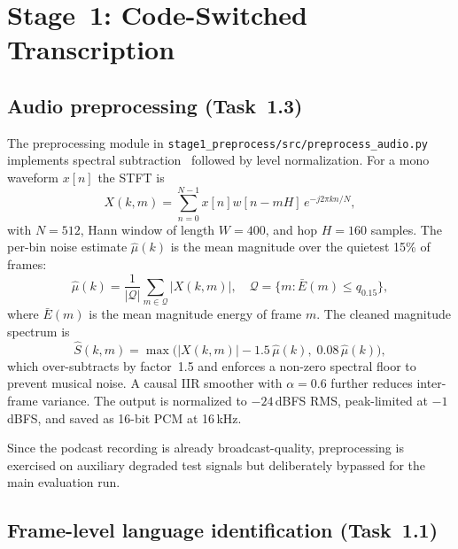 \documentclass[10pt,twocolumn,letterpaper]{article}
\begin{document}
\section{Stage~1: Code-Switched Transcription}
\label{sec:part1}

\subsection{Audio preprocessing (Task~1.3)}
\label{sec:preproc}

The preprocessing module in \texttt{stage1\_preprocess/src/preprocess\_audio.py}
implements spectral subtraction~\cite{boll1979spectral} followed by
level normalization.  For a mono waveform $x[n]$ the STFT is
\begin{equation}
  X(k,m) = \sum_{n=0}^{N-1} x[n]w[n-mH]\,e^{-j2\pi kn/N},
  \label{eq:stft}
\end{equation}
with $N=512$, Hann window of length $W=400$, and hop $H=160$ samples.
The per-bin noise estimate $\widehat\mu(k)$ is the mean magnitude over
the quietest 15\% of frames:
\begin{equation}
  \widehat\mu(k)=\frac{1}{|\mathcal{Q}|}\sum_{m\in\mathcal{Q}}|X(k,m)|,
  \quad
  \mathcal{Q}=\bigl\{m: \bar{E}(m)\le q_{0.15}\bigr\},
  \label{eq:noise}
\end{equation}
where $\bar{E}(m)$ is the mean magnitude energy of frame $m$.  The
cleaned magnitude spectrum is
\begin{equation}
  \widehat{S}(k,m)=\max\!\bigl(|X(k,m)|-1.5\,\widehat\mu(k),\;
                               0.08\,\widehat\mu(k)\bigr),
  \label{eq:specloor}
\end{equation}
which over-subtracts by factor~1.5 and enforces a non-zero spectral
floor to prevent musical noise.  A causal IIR smoother with
$\alpha=0.6$ further reduces inter-frame variance.  The output is
normalized to $-24$\,dBFS RMS, peak-limited at $-1$\,dBFS, and saved
as 16-bit PCM at 16\,kHz.

Since the podcast recording is already broadcast-quality,
preprocessing is exercised on auxiliary degraded test signals but
deliberately bypassed for the main evaluation run.

\subsection{Frame-level language identification (Task~1.1)}
\label{sec:lid}
\end{document}
